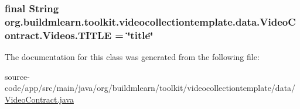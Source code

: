 \subsubsection[{\texorpdfstring{T\+I\+T\+LE}{TITLE}}]{\setlength{\rightskip}{0pt plus 5cm}final String org.\+buildmlearn.\+toolkit.\+videocollectiontemplate.\+data.\+Video\+Contract.\+Videos.\+T\+I\+T\+LE = \char`\"{}title\char`\"{}\hspace{0.3cm}{\ttfamily [static]}}\hypertarget{classorg_1_1buildmlearn_1_1toolkit_1_1videocollectiontemplate_1_1data_1_1VideoContract_1_1Videos_ab56fcb143ed8a14c46cf81833532d9a9}{}\label{classorg_1_1buildmlearn_1_1toolkit_1_1videocollectiontemplate_1_1data_1_1VideoContract_1_1Videos_ab56fcb143ed8a14c46cf81833532d9a9}


The documentation for this class was generated from the following file\+:\begin{DoxyCompactItemize}
\item 
source-\/code/app/src/main/java/org/buildmlearn/toolkit/videocollectiontemplate/data/\hyperlink{VideoContract_8java}{Video\+Contract.\+java}\end{DoxyCompactItemize}
